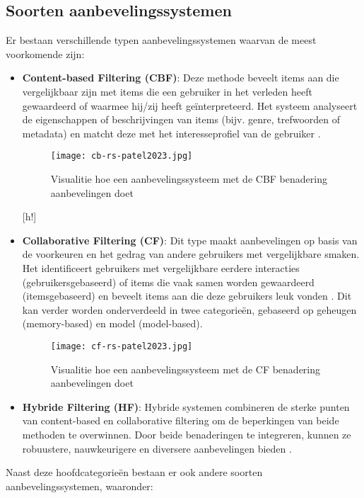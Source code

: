 \subsection{Soorten aanbevelingssystemen}
Er bestaan verschillende typen aanbevelingssystemen waarvan de meest voorkomende zijn:
\begin{itemize}
  \item \textbf{Content-based Filtering (CBF)}: Deze methode beveelt items aan die vergelijkbaar zijn met items die een gebruiker in het verleden heeft gewaardeerd of waarmee hij/zij heeft geïnterpreteerd. Het systeem analyseert de eigenschappen of beschrijvingen van items (bijv. genre, trefwoorden of metadata) en matcht deze met het interesseprofiel van de gebruiker \autocite{Patel2023}.
  \begin{figure}[h!]
    \centering
    \texttt{[image: cb-rs-patel2023.jpg]}
    \caption[Content-based Filtering aanbevelingssysteem]{\label{fig:CBFRS} Visualitie hoe een aanbevelingssysteem met de CBF benadering aanbevelingen doet \autocite{Patel2023}}
  \end{figure}[h!]
  \item \textbf{Collaborative Filtering (CF)}: Dit type maakt aanbevelingen op basis van de voorkeuren en het gedrag van andere gebruikers met vergelijkbare smaken. Het identificeert gebruikers met vergelijkbare eerdere interacties (gebruikersgebaseerd) of items die vaak samen worden gewaardeerd (itemsgebaseerd) en beveelt items aan die deze gebruikers leuk vonden \autocite{Patel2023}. Dit kan verder worden onderverdeeld in twee categorieën, gebaseerd op geheugen (memory-based) en model (model-based).
  \begin{figure}
    \centering
    \texttt{[image: cf-rs-patel2023.jpg]}
    \caption[Collaborative Filtering aanbevelingssysteem]{\label{fig:CFRS} Visualitie hoe een aanbevelingssysteem met de CF benadering aanbevelingen doet \autocite{Patel2023}}
  \end{figure}
  \item \textbf{Hybride Filtering (HF)}: Hybride systemen combineren de sterke punten van content-based en collaborative filtering om de beperkingen van beide methoden te overwinnen. Door beide benaderingen te integreren, kunnen ze robuustere, nauwkeurigere en diversere aanbevelingen bieden \autocite{Patel2023}.
\end{itemize}
Naast deze hoofdcategorieën bestaan er ook andere soorten aanbevelingssystemen, waaronder:
